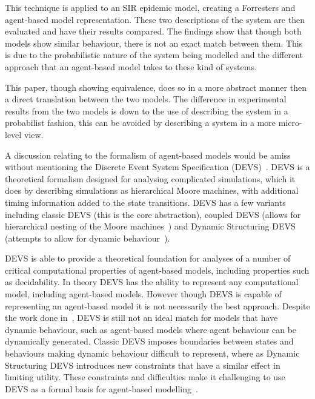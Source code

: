 \documentclass{article}
\begin{document}
This technique is applied to an SIR epidemic model, creating a Forrester\textsc{}s and agent-based model representation. These two descriptions of the system are then evaluated and have their results compared. The findings show that though both models show similar behaviour, there is not an exact match between them. This is due to the probabilistic nature of the system being modelled and the different approach that an agent-based model takes to these kind of systems. 

This paper, though showing equivalence, does so in a more abstract manner then a direct translation between the two models. The difference in experimental results from the two models is down to the use of describing the system in a probabilist fashion, this can be avoided by describing a system in a more micro-level view.    

A discussion relating to the formalism of agent-based models would be amiss without mentioning the Discrete Event System Specification (DEVS)~\cite{introdevs}. DEVS is a theoretical formalism designed for analysing complicated simulations, which it does by describing simulations as hierarchical Moore machines, with additional timing information added to the state transitions. DEVS has a few variants including classic DEVS (this is the core abstraction), coupled DEVS (allows for hierarchical nesting of the Moore machines~\cite{coupleddevs}) and Dynamic Structuring DEVS (attempts to allow for dynamic behaviour~\cite{dynamicdevs}).

DEVS is able to provide a theoretical foundation for analyses of a number of critical computational properties of agent-based models, including properties such as decidability. In theory DEVS has the ability to represent any computational model, including agent-based models. However though DEVS is capable of representing an agent-based model it is not necessarily the best approach. Despite the work done in~\cite{dynamicdevs}, DEVS is still not an ideal match for models that have dynamic behaviour, such as agent-based models where agent behaviour can be dynamically generated. Classic DEVS imposes boundaries between states and behaviours making dynamic behaviour difficult to represent, where as Dynamic Structuring DEVS introduces new constraints that have a similar effect in limiting utility. These constraints and difficulties make it challenging to use DEVS as a formal basis for agent-based modelling~\cite{taabm}.  
\end{document}

